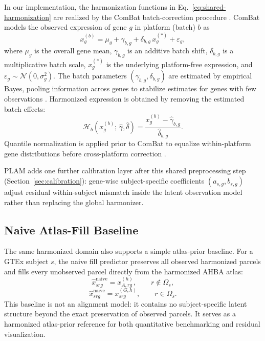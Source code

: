 \documentclass[11pt]{article}
\numberwithin{equation}{section}
\begin{document}
In our implementation, the harmonization functions in Eq.~\eqref{eq:shared-harmonization}
are realized by the ComBat batch-correction procedure
\cite{johnson2007combat,bolstad2003normalization}.
ComBat models the observed expression of gene $g$ in platform (batch) $b$ as
\begin{equation}
  \label{eq:combat}
  x_{g}^{(b)} = \mu_g + \gamma_{b,g} + \delta_{b,g}\,x_g^{(*)} + \varepsilon_g,
\end{equation}
where $\mu_g$ is the overall gene mean, $\gamma_{b,g}$ is an additive batch shift,
$\delta_{b,g}$ is a multiplicative batch scale, $x_g^{(*)}$ is the underlying
platform-free expression, and $\varepsilon_g \sim \mathcal{N}(0,\sigma_g^2)$.
The batch parameters $(\gamma_{b,g}, \delta_{b,g})$ are estimated by empirical Bayes,
pooling information across genes to stabilize estimates for genes with few observations
\cite{johnson2007combat}.  Harmonized expression is obtained by removing the estimated
batch effects:
\[
  \mathcal{H}_b(x_g^{(b)};\,\hat\gamma,\hat\delta)
  = \frac{x_g^{(b)} - \hat\gamma_{b,g}}{\hat\delta_{b,g}}.
\]
Quantile normalization is applied prior to ComBat to equalize within-platform gene
distributions before cross-platform correction \cite{bolstad2003normalization}.

PLAM adds one further calibration layer after this shared
preprocessing step (Section~\ref{sec:calibration}): gene-wise subject-specific
coefficients $(a_{s,g}, b_{s,g})$ adjust residual within-subject mismatch inside
the latent observation model rather than replacing the global harmonizer.

\subsection{Naive Atlas-Fill Baseline}
\label{sec:naive-fill}
The same harmonized domain also supports a simple atlas-prior baseline.  For a GTEx
subject $s$, the naive fill predictor preserves all observed harmonized parcels and
fills every unobserved parcel directly from the harmonized AHBA atlas:
\begin{equation}
  \label{eq:naive-fill-unobs}
  \hat{x}_{srg}^{\text{naive}} = x_{A,rg}^{(h)}, \qquad r \notin \Omega_s,
\end{equation}
\begin{equation}
  \label{eq:naive-fill-obs}
  \hat{x}_{srg}^{\text{naive}} = x_{srg}^{(G,h)}, \qquad r \in \Omega_s.
\end{equation}
This baseline is not an alignment model: it contains no subject-specific latent
structure beyond the exact preservation of observed parcels.  It serves as a
harmonized atlas-prior reference for both quantitative benchmarking and residual
visualization.
\end{document}
